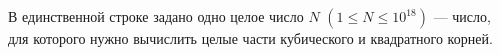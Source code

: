 В единственной строке задано одно целое число $N$ $(1 \le N \le 10^{18})$ --- число, для которого нужно вычислить целые части кубического и квадратного корней.
